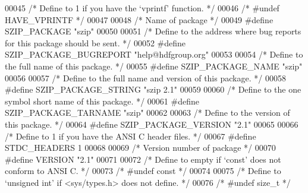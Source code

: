 \begin{DoxyCode}
00045 \textcolor{comment}{/* Define to 1 if you have the `vprintf' function. */}
00046 \textcolor{comment}{/* #undef HAVE\_VPRINTF */}
00047 
00048 \textcolor{comment}{/* Name of package */}
00049 \textcolor{preprocessor}{#define SZIP\_PACKAGE "szip"}
00050 
00051 \textcolor{comment}{/* Define to the address where bug reports for this package should be sent. */}
00052 \textcolor{preprocessor}{#define SZIP\_PACKAGE\_BUGREPORT "help@hdfgroup.org"}
00053 
00054 \textcolor{comment}{/* Define to the full name of this package. */}
00055 \textcolor{preprocessor}{#define SZIP\_PACKAGE\_NAME "szip"}
00056 
00057 \textcolor{comment}{/* Define to the full name and version of this package. */}
00058 \textcolor{preprocessor}{#define SZIP\_PACKAGE\_STRING "szip 2.1"}
00059 
00060 \textcolor{comment}{/* Define to the one symbol short name of this package. */}
00061 \textcolor{preprocessor}{#define SZIP\_PACKAGE\_TARNAME "szip"}
00062 
00063 \textcolor{comment}{/* Define to the version of this package. */}
00064 \textcolor{preprocessor}{#define SZIP\_PACKAGE\_VERSION "2.1"}
00065 
00066 \textcolor{comment}{/* Define to 1 if you have the ANSI C header files. */}
00067 \textcolor{preprocessor}{#define STDC\_HEADERS 1}
00068 
00069 \textcolor{comment}{/* Version number of package */}
00070 \textcolor{preprocessor}{#define VERSION "2.1"}
00071 
00072 \textcolor{comment}{/* Define to empty if `const' does not conform to ANSI C. */}
00073 \textcolor{comment}{/* #undef const */}
00074 
00075 \textcolor{comment}{/* Define to `unsigned int' if <sys/types.h> does not define. */}
00076 \textcolor{comment}{/* #undef size\_t */}
\end{DoxyCode}
